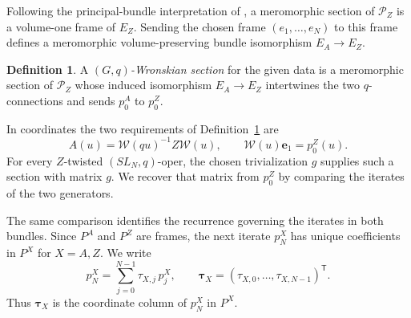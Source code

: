 \documentclass[11pt,leqno]{amsart}
\numberwithin{equation}{section}
\theoremstyle{plain}
\theoremstyle{definition}
\newtheorem{definition}[theorem]{Definition}
\theoremstyle{plain}
\theoremstyle{definition}
\theoremstyle{remark}
\begin{document}
Following the principal-bundle interpretation of \cite[Definition~4.9]{KZ2021}, a meromorphic section of $\mathcal P_Z$ is a volume-one frame of $E_Z$.  Sending the chosen frame $(e_1,\ldots,e_N)$ to this frame defines a meromorphic volume-preserving bundle isomorphism $E_A\to E_Z$.

\begin{definition}\label{def:typeA-Wronskian-section}
A \emph{$(G,q)$-Wronskian section} for the given data is a meromorphic section of $\mathcal P_Z$ whose induced isomorphism $E_A\to E_Z$ intertwines the two $q$-connections and sends $p_0^A$ to $p_0^Z$.
\end{definition}

In coordinates the two requirements of Definition~\ref{def:typeA-Wronskian-section} are
\begin{equation}\label{eq:typeA-Wronskian-section}
 A(u)=\mathscr W(qu)^{-1}Z\mathscr W(u),
 \qquad \mathscr W(u)\mathbf e_1=p_0^Z(u).
\end{equation}
For every $Z$-twisted $(SL_N,q)$-oper, the chosen trivialization $g$ supplies such a section with matrix $g$. We recover that matrix from $p_0^Z$ by comparing the iterates of the two generators.

The same comparison identifies the recurrence governing the iterates in both bundles. Since $P^A$ and $P^Z$ are frames, the next iterate $p_N^X$ has unique coefficients in $P^X$ for $X=A,Z$. We write
\begin{equation}\label{eq:typeA-cyclic-recurrences}
 p_N^X=\sum_{j=0}^{N-1}\tau_{X,j}\,p_j^X,
 \qquad
 \boldsymbol\tau_X=(\tau_{X,0},\ldots,\tau_{X,N-1})^{\mathsf T}.
\end{equation}
Thus $\boldsymbol\tau_X$ is the coordinate column of $p_N^X$ in $P^X$.
\end{document}
